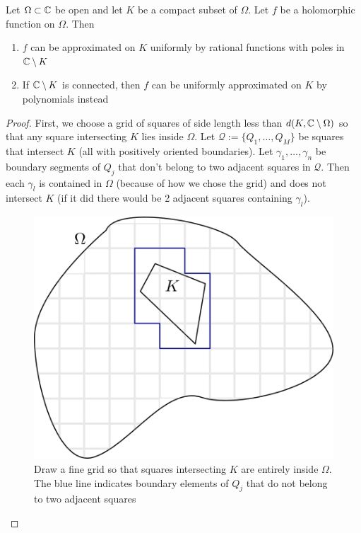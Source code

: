 \begin{theorem}
    Let $\Omega \subset \mathbb{C}$ be open and let $K$ be a compact subset of $\Omega$. Let $f$ be a holomorphic function on $\Omega$. Then
    \begin{enumerate}
        \item $f$ can be approximated on $K$ uniformly by rational functions with poles in $\mathbb{C} \setminus K$
        \item If $\mathbb{C} \setminus K$ is connected, then $f$ can be uniformly approximated on $K$ by polynomials instead
    \end{enumerate}
\end{theorem}
\begin{proof}
    First, we choose a grid of squares of side length less than $d(K, \mathbb{C} \setminus \Omega)$ so that any square intersecting $K$ lies inside $\Omega$. Let $\mathcal{Q} := \{Q_1, \dots, Q_M\}$ be squares that intersect $K$ (all with positively oriented boundaries). Let $\gamma_1, \dots, \gamma_n$ be boundary segments of $Q_j$ that don't belong to two adjacent squares in $\mathcal{Q}$. Then each $\gamma_l$ is contained in $\Omega$ (because of how we chose the grid) and does not intersect $K$ (if it did there would be 2 adjacent squares containing $\gamma_l$).

    \begin{figure}[ht]
        \centering
        \includegraphics[scale=0.9]{Images/runge_approx_grid.png}
        \caption{Draw a fine grid so that squares intersecting $K$ are entirely inside $\Omega$. The blue line indicates boundary elements of $Q_j$ that do not belong to two adjacent squares}
        \label{fig:runge-approx-grid}
    \end{figure}


\end{proof}
